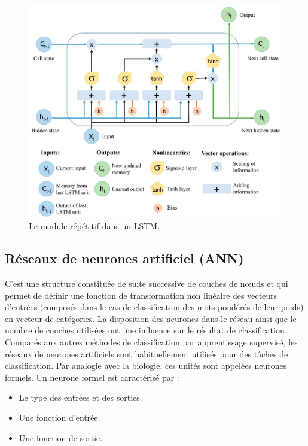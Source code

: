 \begin{figure}[!h]
\centering
\includegraphics[scale=0.1]{Images/water-11-01387-g004.png}
\caption{Le module répétitif dans un LSTM.}
\label{fig:16}
\end{figure}
\newpage
\subsection{Réseaux de neurones artificiel (ANN) }
C’est une structure constituée de suite successive de couches de nœuds et qui permet de définir une fonction de transformation non linéaire des vecteurs d’entrées (composés dans le cas de classification des mots pondérés de leur poids) en vecteur de catégories. 
 La disposition des neurones dans le réseau ainsi que le nombre de couches utilisées ont une influence sur le résultat de classification.
Comparés aux autres méthodes de classification par apprentissage supervisé, les réseaux de neurones artificiels sont habituellement utilisés pour des tâches de classification. 
Par analogie avec la biologie, ces unités sont appelées neurones formels.
Un neurone formel est caractérisé par :

\begin{itemize}
\item Le type des entrées et des sorties.
\item Une fonction d’entrée.
\item Une fonction de sortie.
\end{itemize}

